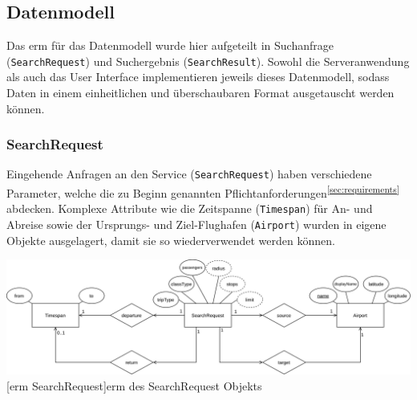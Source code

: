 \documentclass[12pt,twoside,a4paper]{article}
\begin{document}
\begin{sloppypar}
\subsection{Datenmodell}\label{sec:data-model}
Das \acrlong{erm} für das Datenmodell wurde hier aufgeteilt in Suchanfrage (\texttt{SearchRequest}) und Suchergebnis (\texttt{SearchResult}). Sowohl die Serveranwendung als auch das User Interface implementieren jeweils dieses Datenmodell, sodass Daten in einem einheitlichen und überschaubaren Format ausgetauscht werden können.
\subsubsection{SearchRequest}
Eingehende Anfragen an den Service (\texttt{SearchRequest}) haben verschiedene Parameter, welche die zu Beginn genannten Pflichtanforderungen\textsuperscript{\ref{sec:requirements}} abdecken. Komplexe Attribute wie die Zeitspanne (\texttt{Timespan}) für An- und Abreise sowie der Ursprungs- und Ziel-Flughafen (\texttt{Airport}) wurden in eigene Objekte ausgelagert, damit sie so wiederverwendet werden können.
\begin{center}
	\captionsetup{type=figure}
	\includegraphics[width=\textwidth]{images/datamodel-SearchRequest}
	[\acrshort{erm} SearchRequest]{\acrlong{erm} des SearchRequest Objekts}
\end{center}

\end{sloppypar}
\end{document}
